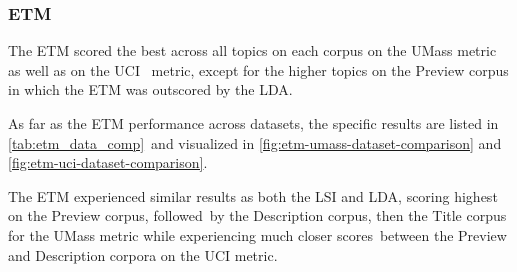 \documentclass[letterpaper,12pt]{article}
\begin{document}
\subsubsection{ETM}
The ETM scored the best across all topics on each corpus on the UMass metric as well as on the UCI \
metric, except for the higher topics on the Preview corpus in which the ETM was outscored by the LDA.

As far as the ETM performance across datasets, the specific results are listed in \ref{tab:etm_data_comp}\
and visualized in \ref{fig:etm-umass-dataset-comparison} and \ref{fig:etm-uci-dataset-comparison}.

The ETM experienced similar results as both the LSI and LDA, scoring highest on the Preview corpus, followed\
by the Description corpus, then the Title corpus for the UMass metric while experiencing much closer scores\
between the Preview and Description corpora on the UCI metric.
\end{document}
